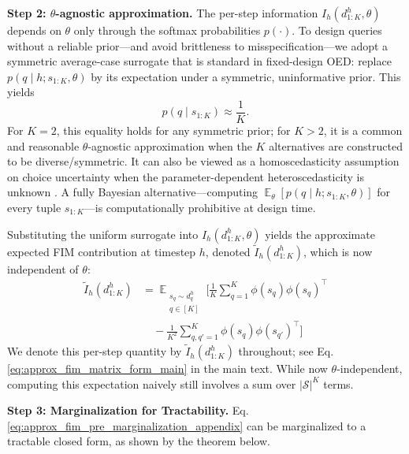 \documentclass{article}
\DeclareMathOperator*{\E}{\mathbb{E}} %
\begin{document}
\textbf{Step 2: $\theta$-agnostic approximation.}\label{sec:appendix_step2_theta_agnostic}
The per-step information $I_h(d_{1:K}^h,\theta)$ depends on $\theta$ only through the softmax probabilities $p(\cdot)$. To design queries without a reliable prior—and avoid brittleness to misspecification—we adopt a symmetric average-case surrogate that is standard in fixed-design OED: replace $p(q\mid h; s_{1:K},\theta)$ by its expectation under a symmetric, uninformative prior. This yields
\[ p(q\mid s_{1:K}) \approx \frac{1}{K}. \]
For $K=2$, this equality holds for any symmetric prior; for $K>2$, it is a common and reasonable $\theta$-agnostic approximation when the $K$ alternatives are constructed to be diverse/symmetric. It can also be viewed as a homoscedasticity assumption on choice uncertainty when the parameter-dependent heteroscedasticity is unknown \cite{doi:10.1137/1.9780898719109}. A fully Bayesian alternative---computing $\E_{\theta}[p(q\mid h; s_{1:K},\theta)]$ for every tuple $s_{1:K}$---is computationally prohibitive at design time.

Substituting the uniform surrogate into $I_h(d_{1:K}^h, \theta)$ yields the approximate expected FIM contribution at timestep $h$, denoted $\tilde{I}_h(d_{1:K}^h)$, which is now independent of $\theta$:
\begin{equation}
\label{eq:approx_fim_pre_marginalization_appendix}
\begin{aligned}
\tilde{I}_h(d_{1:K}^h)
&= \E_{\substack{s_q \sim d^h_{q} \\ q \in [K]}} \Bigg[ \frac{1}{K} \sum_{q=1}^K \phi(s_q)\phi(s_q)^\top \\
&\quad - \frac{1}{K^2} \sum_{q,q'=1}^K \phi(s_q)\phi(s_{q'})^\top \Bigg]
\end{aligned}
\end{equation}
We denote this per-step quantity by $\tilde{I}_h(d_{1:K}^h)$ throughout; see Eq. \ref{eq:approx_fim_matrix_form_main} in the main text.
While now $\theta$-independent, computing this expectation naively still involves a sum over $|\mathcal{S}|^K$ terms.

\textbf{Step 3: Marginalization for Tractability.}
Eq. \ref{eq:approx_fim_pre_marginalization_appendix} can be marginalized to a tractable closed form, as shown by the theorem below.
\end{document}
